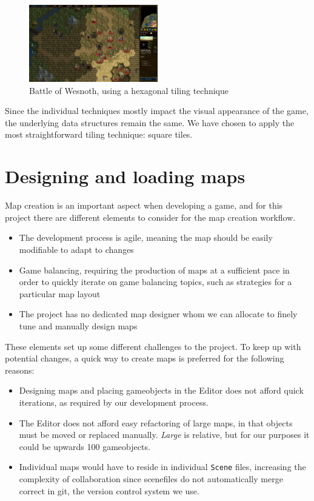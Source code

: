 \begin{figure}[H]
    \centering
    \includegraphics[width=0.5\textwidth]{figures/generating_levels/wesnoth_hex.png}
    \caption{Battle of Wesnoth, using a hexagonal tiling technique}\label{fig:wesnoth_hex}
\end{figure}
Since the individual techniques mostly impact the visual appearance of the game, the underlying data structures remain the same.
We have chosen to apply the most straightforward tiling technique: square tiles.

\section{Designing and loading maps}
Map creation is an important aspect when developing a game, and for this project there are different elements to consider for the map creation workflow.
\begin{itemize}
    \item The development process is agile, meaning the map should be easily modifiable to adapt to changes
    \item Game balancing, requiring the production of maps at a sufficient pace in order to quickly iterate on game balancing topics, such as strategies for a particular map layout
    \item The project has no dedicated map designer whom we can allocate to finely tune and manually design maps
\end{itemize}
These elements set up some different challenges to the project.
To keep up with potential changes, a quick way to create maps is preferred for the following reasons:
\begin{itemize}
    \item Designing maps and placing gameobjects in the Editor does not afford quick iterations, as required by our development process.
    \item The Editor does not afford easy refactoring of large maps, in that objects must be moved or replaced manually. \textit{Large} is relative, but for our purposes it could be upwards 100 gameobjects.
    \item Individual maps would have to reside in individual \texttt{Scene} files, increasing the complexity of collaboration since scenefiles do not  automatically merge correct in git, the version control system we use.
\end{itemize}

